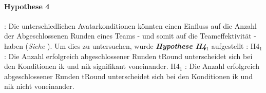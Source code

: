 \documentclass[a4paper,11pt]{article}%
\renewcommand{\\}{\vspace*{0.5\baselineskip} \newline}
\begin{document}
\paragraph{Hypothese 4}:
Die unterschiedlichen Avatarkonditionen könnten einen Einfluss auf die Anzahl der Abgeschlossenen Runden eines Teams - und somit auf die Teameffektivität - haben (\textit{Siehe }). Um dies zu untersuchen, wurde \textbf{\textit{Hypothese H4$_{1}$}} aufgestellt :\\
H4$_{1}$ : Die Anzahl erfolgreich abgeschlossener Runden \ac{tRound} unterscheidet sich bei den Konditionen \ac{ik} und \ac{nik} signifikant voneinander. \newline
H4$_{1}$ : Die Anzahl erfolgreich abgeschlossener Runden \ac{tRound} unterscheidet sich bei den Konditionen \ac{ik} und \ac{nik} nicht voneinander. \\
%	
\end{document}
